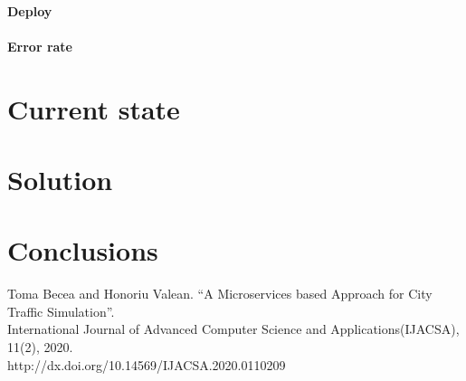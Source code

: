 \documentclass[conference]{IEEEtran}
\begin{document}
\paragraph{Deploy}
\paragraph{Error rate}

\section{Current state}

\section{Solution}

\section{Conclusions}

\begin{thebibliography}{00}

     Toma Becea and Honoriu Valean. “A Microservices based Approach for City Traffic Simulation”. \\ International Journal of Advanced Computer Science and Applications(IJACSA), 11(2), 2020. \\ http://dx.doi.org/10.14569/IJACSA.2020.0110209

\end{thebibliography}
\end{document}
